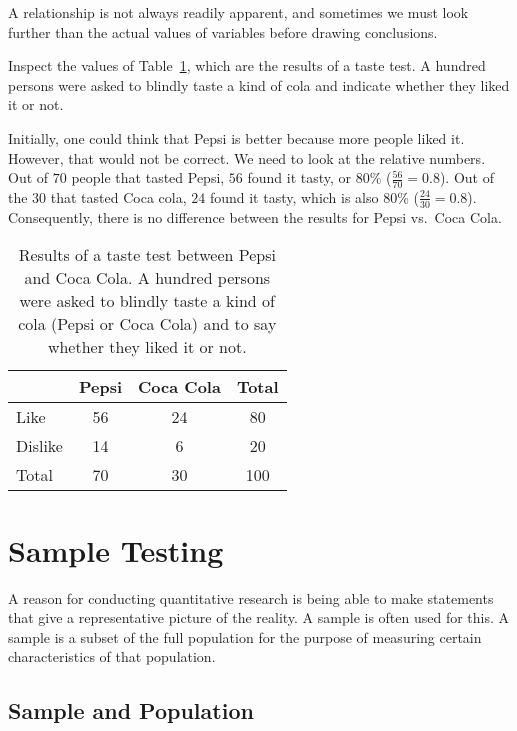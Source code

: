 A relationship is not always readily apparent, and sometimes we must look further than the actual values of variables before drawing conclusions.

\begin{example}
    Inspect the values of Table~\ref{tab:pepsi-coca}, which are the results of a taste test. 
    A hundred persons were asked to blindly taste a kind of cola and indicate whether they liked it or not.
    
    Initially, one could think that Pepsi is better because more people liked it. 
    However, that would not be correct. We need to look at the relative numbers. 
    Out of $70$ people that tasted Pepsi, $56$ found it tasty, or $80\%$ ($\frac{56}{70} = 0.8$). 
    Out of the $30$ that tasted Coca cola, $24$ found it tasty, which is also $80\%$ ($\frac{24}{30} = 0.8$). 
    Consequently, there is no difference between the results for Pepsi vs.~Coca Cola.
\end{example}    

\begin{table}
    \centering
    \begin{tabular}{l|cc|c}
                  & Pepsi & Coca Cola & Total \\
        \midrule
        Like      &  56   &    24     &   80  \\
        Dislike   &  14   &     6     &   20  \\
        \midrule
        Total     &  70   &    30     &  100
    \end{tabular}
    \caption[Results of a taste test between Pepsi and Coca Cola.]{Results of a taste test between Pepsi and Coca Cola. A hundred persons were asked to blindly taste a kind of cola (Pepsi or Coca Cola) and to say whether they liked it or not.}
    \label{tab:pepsi-coca}
\end{table}

\section{Sample Testing}
\label{sec:onderzoeksproces-steekproefonderzoek}

A reason for conducting quantitative research is being able to make statements that give a representative picture of the reality. A sample is often used for this. A sample is a subset of the full population for the purpose of measuring certain characteristics of that population.

\subsection{Sample and Population}

